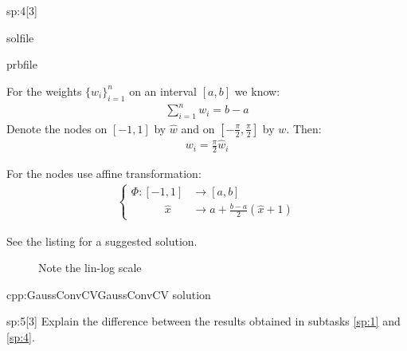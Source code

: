 \begin{samproblem}
\begin{subproblem}{sp:4}[3]
\begin{samwriteprbpart}{solfile}
\begin{writeverbatim}{prbfile}
\begin{samsolution}
        For the weights $\{w_i\}_{i=1}^n$ on an interval $[a,b]$ we know:
        \begin{align}
          \sum_{i=1}^n w_i = b - a
        \end{align}
        Denote the nodes on $[-1,1]$ by $\hat{w}$ and on $[-\frac{\pi}{2}, \frac{\pi}{2}]$ by $w$.
        Then:
        \begin{align}
          w_i = \frac{\pi}{2} \hat{w}_i
        \end{align}

        For the nodes use affine transformation:
        \begin{align}
          \begin{cases}
            \Phi: [-1,1] &\rightarrow [a,b] \\
            \quad \quad \quad \hat{x} &\rightarrow a + \frac{b-a}{2} (\hat{x} + 1)
          \end{cases}
        \end{align}

        See the listing for a suggested solution.
        \begin{figure}
          \centering 
          \caption{Note the lin-log scale}
        \end{figure}

        \begin{samcode}[C++-code]{cpp:GaussConvCV}{GaussConvCV solution}
          \small
          
        \end{samcode}
      \end{samsolution}
    \end{writeverbatim}
  \end{samwriteprbpart}

\end{subproblem}

\begin{subproblem}{sp:5}[3]
Explain the difference between the results obtained in subtasks \ref{sp:1} and \ref{sp:4}.


\end{subproblem}
\end{samproblem}
